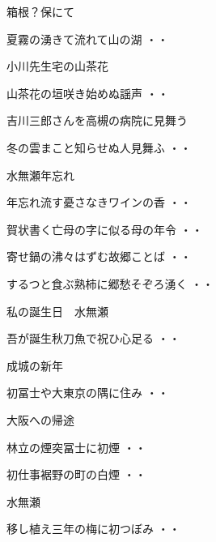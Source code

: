 \vspace{0.6cm}
箱根？保にて
\begin{shiika}夏霧の湧きて流れて山の湖
\hfill{・・}\end{shiika}
\vspace{0.6cm}
小川先生宅の山茶花
\begin{shiika}山茶花の垣咲き始めぬ謡声
\hfill{・・}\end{shiika}
\vspace{0.6cm}
吉川三郎さんを高槻の病院に見舞う
\begin{shiika}冬の雲まこと知らせぬ人見舞ふ
\hfill{・・}\end{shiika}
\vspace{0.6cm}
水無瀬年忘れ
\begin{shiika}年忘れ流す憂さなきワインの香
\hfill{・・}\end{shiika}
\begin{shiika}賀状書く亡母の字に似る母の年令
\hfill{・・}\end{shiika}
\begin{shiika}寄せ鍋の沸々はずむ故郷ことば
\hfill{・・}\end{shiika}
\begin{shiika}するつと食ぶ熟柿に郷愁そぞろ湧く
\hfill{・・}\end{shiika}
\vspace{0.6cm}
私の誕生日　水無瀬
\begin{shiika}吾が誕生秋刀魚で祝ひ心足る
\hfill{・・}\end{shiika}
\vspace{0.6cm}
成城の新年
\begin{shiika}初冨士や大東京の隅に住み
\hfill{・・}\end{shiika}
\vspace{0.6cm}
大阪への帰途
\begin{shiika}林立の煙突冨士に初煙
\hfill{・・}\end{shiika}
\begin{shiika}初仕事裾野の町の白煙
\hfill{・・}\end{shiika}
\vspace{0.6cm}
水無瀬
\begin{shiika}移し植え三年の梅に初つぼみ
\hfill{・・}\end{shiika}
